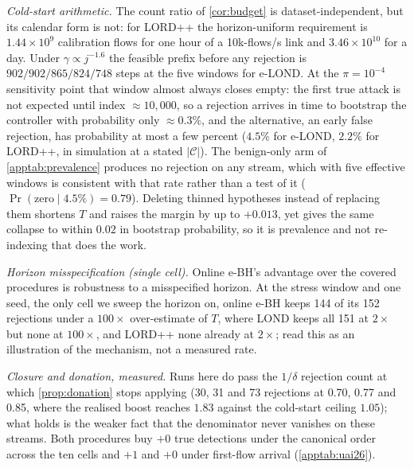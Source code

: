 \documentclass[conference]{IEEEtran}
\newcommand{\Cal}{\mathcal{C}}
\newcommand{\nCal}{\lvert\Cal\rvert}
\begin{document}
\emph{Cold-start arithmetic.} The count ratio of \cref{cor:budget} is dataset-independent, but its
calendar form is not: for LORD++ the horizon-uniform requirement is $1.44\times10^{9}$ calibration flows
for one hour of a 10k-flows/s link and $3.46\times10^{10}$ for a day. Under $\gamma\propto j^{-1.6}$ the
feasible prefix before any rejection is $902/902/865/824/748$ steps at the five windows for e-LOND. At the $\pi=10^{-4}$ sensitivity point
that window almost always closes empty: the first true attack is not expected until index
$\approx10{,}000$, so a rejection arrives in time to bootstrap the controller with probability only
$\approx0.3\%$, and the alternative, an early false rejection, has probability at most a few percent
($4.5\%$ for e-LOND, $2.2\%$ for LORD++, in simulation at a stated $\nCal$). The benign-only arm of
\cref{apptab:prevalence} produces no rejection on any stream, which with five effective windows is
consistent with that rate rather than a test of it ($\Pr(\text{zero}\mid4.5\%)=0.79$). Deleting thinned
hypotheses instead of replacing them shortens $T$ and raises the margin by up to $+0.013$, yet gives the
same collapse to within $0.02$ in bootstrap probability, so it is prevalence and not re-indexing that does
the work.

\emph{Horizon misspecification (single cell).} Online e-BH's advantage over the covered procedures is
robustness to a misspecified horizon. At the stress window and one seed, the only cell we sweep the
horizon on, online e-BH keeps 144 of its 152 rejections under a $100\times$ over-estimate of $T$, where
LOND keeps all 151 at $2\times$ but none at $100\times$, and LORD++ none already at $2\times$; read this as
an illustration of the mechanism, not a measured rate.

\emph{Closure and donation, measured.} Runs here do pass the $1/\delta$ rejection count at which
\cref{prop:donation} stops applying (30, 31 and 73 rejections at 0.70, 0.77 and 0.85, where the realised
boost reaches $1.83$ against the cold-start ceiling $1.05$); what holds is the weaker fact that the
denominator never vanishes on these streams. Both procedures buy $+0$ true detections under the canonical
order across the ten cells and $+1$ and $+0$ under first-flow arrival (\cref{apptab:uai26}).









\end{document}
